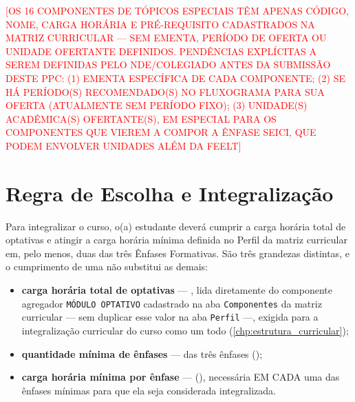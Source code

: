
\textcolor{red}{[OS 16 COMPONENTES DE TÓPICOS ESPECIAIS TÊM APENAS CÓDIGO, NOME, CARGA HORÁRIA E PRÉ-REQUISITO CADASTRADOS NA MATRIZ CURRICULAR — SEM EMENTA, PERÍODO DE OFERTA OU UNIDADE OFERTANTE DEFINIDOS. PENDÊNCIAS EXPLÍCITAS A SEREM DEFINIDAS PELO NDE/COLEGIADO ANTES DA SUBMISSÃO DESTE PPC: (1) EMENTA ESPECÍFICA DE CADA COMPONENTE; (2) SE HÁ PERÍODO(S) RECOMENDADO(S) NO FLUXOGRAMA PARA SUA OFERTA (ATUALMENTE SEM PERÍODO FIXO); (3) UNIDADE(S) ACADÊMICA(S) OFERTANTE(S), EM ESPECIAL PARA OS COMPONENTES QUE VIEREM A COMPOR A ÊNFASE SEICI, QUE PODEM ENVOLVER UNIDADES ALÉM DA FEELT]}

\section{Regra de Escolha e Integralização}
\label{sec:regra_escolha}

Para integralizar o curso, o(a) estudante deverá cumprir a carga horária total de optativas e atingir a carga horária mínima definida no Perfil da matriz curricular em, pelo menos, duas das três Ênfases Formativas. São três grandezas distintas, e o cumprimento de uma não substitui as demais:

\begin{itemize}
    \item \textbf{carga horária total de optativas} — \textbf{}, lida diretamente do componente agregador \texttt{MÓDULO OPTATIVO} cadastrado na aba \texttt{Componentes} da matriz curricular — sem duplicar esse valor na aba \texttt{Perfil} —, exigida para a integralização curricular do curso como um todo (\autoref{chp:estrutura_curricular});
    \item \textbf{quantidade mínima de ênfases} — \textbf{} das três ênfases ();
    \item \textbf{carga horária mínima por ênfase} — \textbf{} (), necessária EM CADA uma das  ênfases mínimas para que ela seja considerada integralizada.
\end{itemize}

